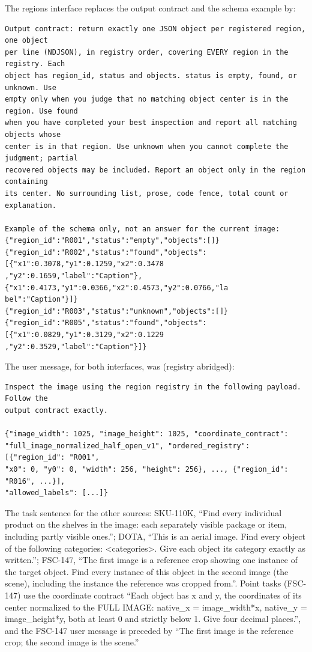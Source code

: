 \noindent The regions interface replaces the output contract and the schema example by:

{\footnotesize
\begin{verbatim}
Output contract: return exactly one JSON object per registered region, one object
per line (NDJSON), in registry order, covering EVERY region in the registry. Each
object has region_id, status and objects. status is empty, found, or unknown. Use
empty only when you judge that no matching object center is in the region. Use found
when you have completed your best inspection and report all matching objects whose
center is in that region. Use unknown when you cannot complete the judgment; partial
recovered objects may be included. Report an object only in the region containing
its center. No surrounding list, prose, code fence, total count or explanation.

Example of the schema only, not an answer for the current image:
{"region_id":"R001","status":"empty","objects":[]}
{"region_id":"R002","status":"found","objects":[{"x1":0.3078,"y1":0.1259,"x2":0.3478
,"y2":0.1659,"label":"Caption"},{"x1":0.4173,"y1":0.0366,"x2":0.4573,"y2":0.0766,"la
bel":"Caption"}]}
{"region_id":"R003","status":"unknown","objects":[]}
{"region_id":"R005","status":"found","objects":[{"x1":0.0829,"y1":0.3129,"x2":0.1229
,"y2":0.3529,"label":"Caption"}]}
\end{verbatim}
}

\noindent The user message, for both interfaces, was (registry abridged):

{\footnotesize
\begin{verbatim}
Inspect the image using the region registry in the following payload. Follow the
output contract exactly.

{"image_width": 1025, "image_height": 1025, "coordinate_contract":
"full_image_normalized_half_open_v1", "ordered_registry": [{"region_id": "R001",
"x0": 0, "y0": 0, "width": 256, "height": 256}, ..., {"region_id": "R016", ...}],
"allowed_labels": [...]}
\end{verbatim}
}

\noindent The task sentence for the other sources: SKU-110K, ``Find every individual product on the shelves in the image: each separately visible package or item, including partly visible ones.''; DOTA, ``This is an aerial image. Find every object of the following categories: <categories>. Give each object its category exactly as written.''; FSC-147, ``The first image is a reference crop showing one instance of the target object. Find every instance of this object in the second image (the scene), including the instance the reference was cropped from.''. Point tasks (FSC-147) use the coordinate contract ``Each object has x and y, the coordinates of its center normalized to the FULL IMAGE: native\_x = image\_width*x, native\_y = image\_height*y, both at least 0 and strictly below 1. Give four decimal places.'', and the FSC-147 user message is preceded by ``The first image is the reference crop; the second image is the scene.''

